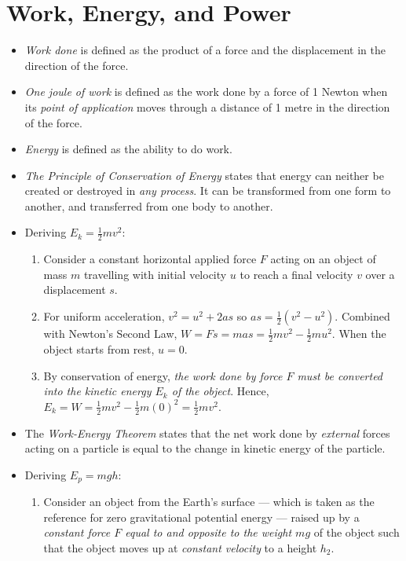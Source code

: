 \documentclass[oneside]{book}
\begin{document}
\chapter{Work, Energy, and Power}
\begin{itemize}
    \item \textit{Work done} is defined as the product of a force and the displacement in the direction of the force.
    \item \textit{One joule of work} is defined as the work done by a force of 1 Newton when its \emph{point of application} moves through a distance of 1 metre in the direction of the force.
    \item \textit{Energy} is defined as the ability to do work.
    \item \textit{The Principle of Conservation of Energy} states that energy can neither be created or destroyed in \emph{any process}. It can be transformed from one form to another, and transferred from one body to another.
    \item Deriving \(E_k=\frac{1}{2}mv^2\): 
    \begin{enumerate}
        \item Consider a constant horizontal applied force \(F\) acting on an object of mass \(m\) travelling with initial velocity \(u\) to reach a final velocity \(v\) over a displacement \(s\). 
        \item For uniform acceleration, \(v^2=u^2+2as\) so \(as=\frac{1}{2}(v^2-u^2)\). Combined with Newton's Second Law, \(W=Fs=mas=\frac{1}{2}mv^2-\frac{1}{2}mu^2\). When the object starts from rest, \(u=0\). 
        \item By conservation of energy,\emph{ the work done by force \(F\) must be converted into the kinetic energy \(E_k\) of the object}. Hence, \(E_k=W=\frac{1}{2}mv^2-\frac{1}{2}m(0)^2=\frac{1}{2}mv^2\).
    \end{enumerate}
    \item The \textit{Work-Energy Theorem} states that the net work done by \emph{external} forces acting on a particle is equal to the change in kinetic energy of the particle.
    \item Deriving \(E_p=mgh\):
    \begin{enumerate}
        \item Consider an object from the Earth's surface --- which is taken as the reference for zero gravitational potential energy --- raised up by a \emph{constant force \(F\) equal to and opposite to the weight \(mg\)} of the object such that the object moves up at \emph{constant velocity} to a height \(h_2\). 

\end{enumerate}
\end{itemize}
\end{document}
